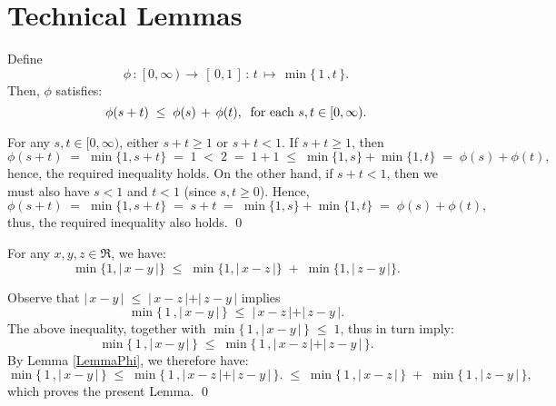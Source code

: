 

\section{Technical Lemmas}
\setcounter{theorem}{0}
\setcounter{equation}{0}

\renewcommand{\theenumi}{\roman{enumi}}
\renewcommand{\labelenumi}{\textnormal{(\theenumi)}$\;\;$}

\begin{lemma}\label{LemmaPhi}
Define
\begin{equation*}
\phi \, : \; [\,0,\infty\,) \, \longrightarrow \, [\,0,1\,] \, : \, t \, \longmapsto \,\min\{\,1\,,t\,\}. 
\end{equation*}
Then, $\phi$ satisfies:
\begin{equation*}
\phi(s + t) \; \leq \; \phi(s) \,+\, \phi(t),
\;\;\textnormal{for each $s, t \in [0,\infty)$}.
\end{equation*}
\end{lemma}
\proof
For any $s, t \in [0,\infty)$, either $s + t \geq 1$ or $s + t <1$. 
If $s + t \geq 1$, then
\begin{equation*}
\phi(s+t)
\;=\; \min\{1,s + t\}
\;=\; 1
\;<\; 2
\;=\; 1 + 1
\;\leq\; \min\{1,s\} + \min\{1,t\}
\;=\; \phi(s) + \phi(t),
\end{equation*}
hence, the required inequality holds.
On the other hand, if $s + t < 1$, then we must also have $s < 1$ and $t < 1$ (since $s, t \geq 0$).
Hence,
\begin{equation*}
\phi(s+t)
\;=\; \min\{1,s + t\}
\;=\; s+t
\;=\; \min\{1,s\} + \min\{1,t\}
\;=\; \phi(s) + \phi(t),
\end{equation*}
thus, the required inequality also holds.
\qed

\begin{lemma}\label{LemmaMin}
For any $x, y, z \in \Re$, we have:
\begin{equation*}
\min\{1,\vert\,x-y\,\vert\}
\;\leq\;
\min\{1,\vert\,x-z\,\vert\}
\;+\;
\min\{1,\vert\,z-y\,\vert\}.
\end{equation*}
\end{lemma}
\proof
Observe that $\vert\,x - y\,\vert \;\leq\; \vert\,x-z\,\vert+\vert\,z-y\,\vert$ implies
\begin{equation*}
\min\{\,1\,,\vert\,x - y\,\vert\,\} \;\leq\; \vert\,x-z\,\vert+\vert\,z-y\,\vert.
\end{equation*}
The above inequality, together with $\min\{\,1\,,\vert\,x - y\,\vert\,\} \;\leq\; 1$,
thus in turn imply:
\begin{equation*}
\min\{\,1\,,\vert\,x - y\,\vert\,\} \;\leq\; \min\{\,1\,,\vert\,x-z\,\vert+\vert\,z-y\,\vert\,\}.
\end{equation*}
By Lemma \ref{LemmaPhi}, we therefore have:
\begin{equation*}
\min\{\,1\,,\vert\,x - y\,\vert\,\}
\;\leq\; \min\{\,1\,,\vert\,x-z\,\vert+\vert\,z-y\,\vert\,\}.
\;\leq\; \min\{\,1\,,\vert\,x-z\,\vert\,\} \;+\; \min\{\,1\,,\vert\,z-y\,\vert\,\},
\end{equation*}
which proves the present Lemma.
\qed

